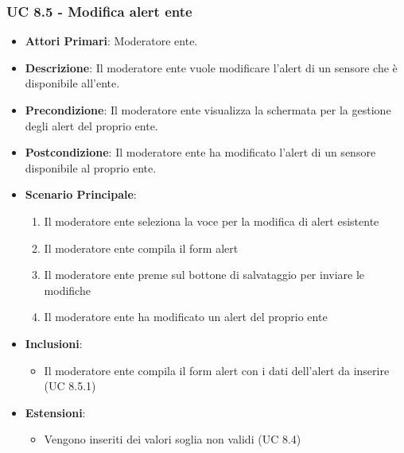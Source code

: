 			\subsubsection{UC 8.5 - Modifica alert ente}
			\begin{itemize}
				\item \textbf{Attori Primari}: Moderatore ente.
				\item \textbf{Descrizione}: Il moderatore ente vuole modificare l'alert di un sensore che è disponibile all'ente.
				\item \textbf{Precondizione}: Il moderatore ente visualizza la schermata per la gestione degli alert del proprio ente.
				\item \textbf{Postcondizione}: Il moderatore ente ha modificato l'alert di un sensore disponibile al proprio ente.
				\item \textbf{Scenario Principale}:
				\begin{enumerate}
					\item{Il moderatore ente seleziona la voce per la modifica di alert esistente}
					\item{Il moderatore ente compila il form alert}
					\item{Il moderatore ente preme sul bottone di salvataggio per inviare le modifiche}
					\item{Il moderatore ente ha modificato un alert del proprio ente }
				\end{enumerate}
				\item \textbf{Inclusioni}:
				\begin{itemize}
					\item Il moderatore ente compila il form alert con i dati dell'alert da inserire (UC 8.5.1)
				\end{itemize}
				\item \textbf{Estensioni}:
				\begin{itemize}
					\item Vengono inseriti dei valori soglia non validi (UC 8.4)
				\end{itemize}		
			\end{itemize}
			
